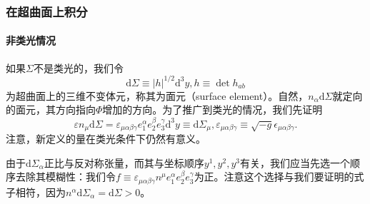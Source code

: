 \documentclass[hyperref, UTF8, a4paper]{ctexart}
\begin{document}
\subsubsection{在超曲面上积分}
\paragraph{非类光情况}

如果$\Sigma $不是类光的，我们令
\begin{equation*}
	\mathrm{d} \Sigma \equiv | h| ^{1/2}\mathrm{d}^{3} y,h\equiv \det h_{ab}
\end{equation*}
为超曲面上的三维不变体元，称其为面元（surface element）。自然，$n_{\alpha }\mathrm{d} \Sigma $就定向的面元，其方向指向$\Phi $增加的方向。为了推广到类光的情况，我们先证明
\begin{equation*}
	\varepsilon n_{\mu }\mathrm{d} \Sigma =\varepsilon _{\mu \alpha \beta \gamma } e_{1}^{\alpha } e_{2}^{\beta } e_{3}^{\gamma }\mathrm{d}^{3} y\equiv \mathrm{d} \Sigma _{\mu } ,\varepsilon _{\mu \alpha \beta \gamma } \equiv \sqrt{-g} \epsilon _{\mu \alpha \beta \gamma } .
\end{equation*}
注意，新定义的量在类光条件下仍然有意义。

由于$\mathrm{d} \Sigma _{\alpha }$正比与反对称张量，而其与坐标顺序$y^{1} ,y^{2} ,y^{3}$有关，我们应当先选一个顺序去除其模糊性：我们令$f\equiv \varepsilon _{\mu \alpha \beta \gamma } n^{\mu } e_{1}^{\alpha } e_{2}^{\beta } e_{3}^{\gamma }$为正。注意这个选择与我们要证明的式子相符，因为$n^{\alpha }\mathrm{d} \Sigma _{\alpha } =\mathrm{d} \Sigma  >0$。
\end{document}

